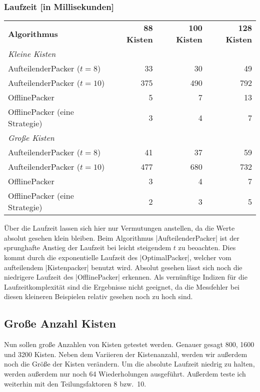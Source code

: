 \subsubsection*{Laufzeit [in Millisekunden]}
\begin{center}
\begin{tabular}{lrrr}
\vspace*{.42em}
\textbf{Algorithmus} 	& \textbf{88 Kisten} 	& \textbf{100 Kisten} 	& \textbf{128 Kisten} 	\\
\textit{Kleine Kisten} & & & \\
 AufteilenderPacker ($t=8$)  	& 33		& 30			& 49			\\
 AufteilenderPacker ($t=10$)  	& 375		& 490			& 792			\\
 OfflinePacker			& 5		& 7			& 13			\\
 OfflinePacker (eine Strategie)	& 3		& 4			& 7			\\
\vspace*{.42em}
\textit{Große Kisten} & & & \\
 AufteilenderPacker ($t=8$)  	& 41		& 37			& 59			\\
 AufteilenderPacker ($t=10$)	& 477		& 680			& 732			\\
 OfflinePacker			& 3		& 4			& 7			\\
 OfflinePacker (eine Strategie)	& 2		& 3			& 5			\\
\end{tabular}
\end{center}
 Über die Laufzeit lassen sich hier nur Vermutungen anstellen, da die Werte absolut gesehen klein bleiben.
 Beim Algorithmus |AufteilenderPacker| ist der sprunghafte Anstieg der Laufzeit bei leicht steigendem $t$ zu beoachten.
 Dies kommt durch die exponentielle Laufzeit des |OptimalPacker|, welcher vom aufteilendem |Kistenpacker| benutzt wird.
 Absolut gesehen lässt sich noch die niedrigere Laufzeit des |OfflinePacker| erkennen.
 Als vernünftige Indizen für die Laufzeitkomplexität sind die Ergebnisse nicht geeignet,
  da die Messfehler bei diesen kleineren Beispielen relativ gesehen noch zu hoch sind.

\subsection{Große Anzahl Kisten}
 Nun sollen große Anzahlen von Kisten getestet werden. Genauer gesagt 800, 1600 und 3200 Kisten.
 Neben dem Variieren der Kistenanzahl, werden wir außerdem noch die Größe der Kisten verändern.
 Um die absolute Laufzeit niedrig zu halten, werden außerdem nur noch 64 Wiederholungen ausgeführt.
 Außerdem teste ich weiterhin mit den Teilungsfaktoren 8 bzw.\ 10.

